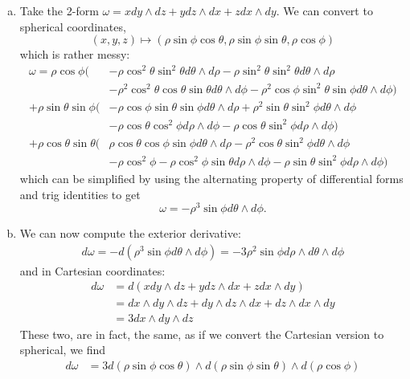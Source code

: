 \documentclass{../../mathnotes}
\begin{document}
\begin{enumerate}[(a)]
    \item Take the 2-form $\omega=x dy\wedge dz+ydz\wedge dx+zdx\wedge dy$. We can convert to spherical coordinates,
        \[(x,y,z)\mapsto(\rho\sin\phi\cos\theta,\rho\sin\phi\sin\theta,\rho\cos\phi)\]
        which is rather messy:
        \begin{align*}
            \omega=\rho\cos\phi(&-\rho\cos^2\theta\sin^2\theta d\theta\wedge d\rho -\rho\sin^2\theta\sin^2\theta d\theta\wedge d\rho \\
            &-\rho^2\cos^2\theta\cos\theta\sin\theta d\theta\wedge d\phi-\rho^2\cos\phi\sin^2\theta\sin\phi d\theta\wedge d\phi)\\
            +\rho\sin\theta\sin\phi(&-\rho\cos\phi\sin\theta\sin\phi d\theta\wedge d\rho+\rho^2\sin\theta\sin^2\phi d\theta\wedge d\phi\\
            &-\rho\cos\theta\cos^2\phi d\rho\wedge d\phi-\rho\cos\theta\sin^2\phi d\rho\wedge d\phi)\\
            +\rho\cos\theta\sin\theta(&\rho\cos\theta\cos\phi\sin\phi d\theta\wedge d\rho-\rho^2\cos\theta\sin^2\phi d\theta\wedge d\phi\\
            &-\rho\cos^2\phi-\rho\cos^2\phi\sin\theta d\rho\wedge d\phi-\rho\sin\theta\sin^2\phi d\rho\wedge d\phi)
        \end{align*}
        which can be simplified by using the alternating property of differential forms and trig identities to get
        \[\omega=-\rho^3 \sin\phi d\theta\wedge d\phi.\]
    \item We can now compute the exterior derivative:
        \begin{align*}
            d\omega=-d(\rho^3\sin\phi d\theta \wedge d\phi)=- 3\rho^2\sin\phi d\rho\wedge d\theta \wedge d\phi
        \end{align*}
        and in Cartesian coordinates:
        \begin{align*}
            d\omega&=d(x dy\wedge dz+ydz\wedge dx+zdx\wedge dy)\\
            &=dx\wedge dy \wedge dz+dy\wedge dz\wedge dx+dz\wedge dx \wedge dy\\
            &=3dx\wedge dy \wedge dz
        \end{align*}
        These two, are in fact, the same, as if we convert the Cartesian version to spherical, we find
        \begin{align*}
            d\omega&=3d(\rho\sin\phi\cos\theta)\wedge d(\rho\sin\phi\sin\theta)\wedge d(\rho\cos\phi)\\

\end{align*}
\end{enumerate}
\end{document}
